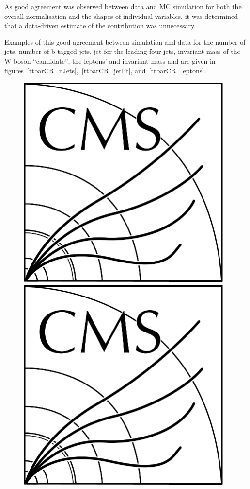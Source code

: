 As good agreement was observed between data and MC simulation for both the overall normalisation and the shapes of individual variables, it was determined that a data-driven estimate of the \ttbar contribution was unnecessary.

Examples of this good agreement between simulation and data for the number of jets, number of b-tagged jets, jet \pT for the leading four jets, invariant mass of the W boson ``candidate'', the leptons' \pt and invariant mass and \pt are given in figures~\ref{ttbarCR_nJets},~\ref{ttbarCR_jetPt}, and~\ref{ttbarCR_leptons}.


\begin{figure}[htb]
\centering
\includegraphics[width=0.97\textwidth]{CMS-bw-logo.pdf}
\\
\includegraphics[width=0.97\textwidth]{CMS-bw-logo.pdf}

\end{figure}
